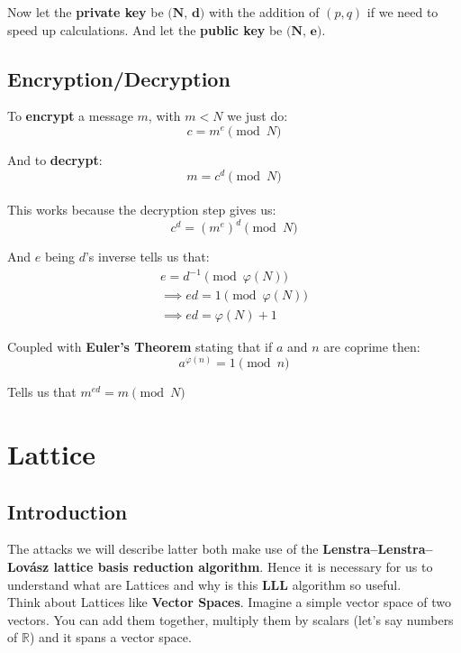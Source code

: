 \documentclass[a4paper,11pt]{article}
\begin{document}
Now let the \textbf{private key} be $\textbf{(N, d)}$ with the addition of $(p, q)$ if we need to speed up calculations.
And let the \textbf{public key} be $\textbf{(N, e)}$.

\subsection{Encryption/Decryption}

To \textbf{encrypt} a message $m$, with $m < N$ we just do:
\[ c = m^e \pmod{N} \]

And to \textbf{decrypt}:
\[ m = c^d \pmod{N} \]\\


This works because the decryption step gives us:
\[ c^d = (m^e)^d \pmod{N} \]

And $e$ being $d$'s inverse tells us that:
\begin{align*}
	e = d^{-1} \pmod{\varphi(N)} \\
	\implies ed = 1 \pmod{\varphi(N)} \\
	\implies ed = \varphi(N) + 1
\end{align*}

Coupled with \textbf{Euler's Theorem} stating that if $a$ and $n$ are coprime then:
\[ a^{\varphi(n)} = 1 \pmod{n} \]

Tells us that $m^{ed} = m \pmod{N}$

\section{Lattice}\label{lattice}

\subsection{Introduction}
The attacks we will describe latter both make use of the \textbf{Lenstra–Lenstra–Lovász lattice basis reduction algorithm}. Hence it is necessary for us to understand what are Lattices and why is this \textbf{LLL} algorithm so useful.\\
Think about Lattices like \textbf{Vector Spaces}. Imagine a simple vector space of two vectors. You can add them together, multiply them by scalars (let's say numbers of $\mathbb{R}$) and it spans a vector space.

\\
\end{document}
